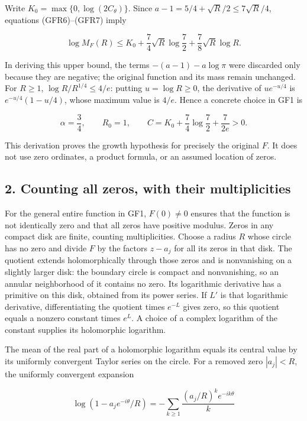 Write \(K_0=\max\{0,\log(2C_\theta)\}\). Since \(a-1=5/4+\sqrt R/2\le7\sqrt R/4\), equations (GFR6)--(GFR7) imply

\[
\log M_F(R)
\le K_0+\frac74\sqrt R\log\frac72
             +\frac78\sqrt R\log R.
\tag{GFR8}
\]

In deriving this upper bound, the terms \(-(a-1)-a\log\pi\) were discarded only because they are negative; the original function and its mass remain unchanged. For \(R\ge1\), \(\log R/R^{1/4}\le4/e\): putting \(u=\log R\ge0\), the derivative of \(ue^{-u/4}\) is \(e^{-u/4}(1-u/4)\), whose maximum value is \(4/e\). Hence a concrete choice in GF1 is

\[
\alpha=\frac34,\qquad R_0=1,\qquad
C=K_0+\frac74\log\frac72+\frac7{2e}>0.
\tag{GFR9}
\]

This derivation proves the growth hypothesis for precisely the original \(F\). It does not use zero ordinates, a product formula, or an assumed location of zeros.

\subsection{2. Counting all zeros, with their multiplicities}\label{counting-all-zeros-with-their-multiplicities}

For the general entire function in GF1, \(F(0)\ne0\) ensures that the function is not identically zero and that all zeros have positive modulus. Zeros in any compact disk are finite, counting multiplicities. Choose a radius \(R\) whose circle has no zero and divide \(F\) by the factors \(z-a_j\) for all its zeros in that disk. The quotient extends holomorphically through those zeros and is nonvanishing on a slightly larger disk: the boundary circle is compact and nonvanishing, so an annular neighborhood of it contains no zero. Its logarithmic derivative has a primitive on this disk, obtained from its power series. If \(L'\) is that logarithmic derivative, differentiating the quotient times \(e^{-L}\) gives zero, so this quotient equals a nonzero constant times \(e^L\). A choice of a complex logarithm of the constant supplies its holomorphic logarithm.

The mean of the real part of a holomorphic logarithm equals its central value by its uniformly convergent Taylor series on the circle. For a removed zero \(|a_j|<R\), the uniformly convergent expansion

\[
\log(1-a_je^{-i\theta}/R)
=-\sum_{k\ge1}\frac{(a_j/R)^ke^{-ik\theta}}k
\]

